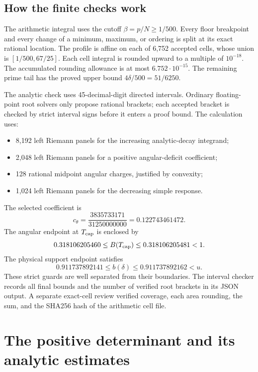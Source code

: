 \documentclass[11pt]{article}
\theoremstyle{definition}\newtheorem{definition}[theorem]{Definition}
\theoremstyle{remark}\newtheorem{remark}[theorem]{Remark}
\begin{document}
\subsection{How the finite checks work}
The arithmetic integral uses the cutoff $\beta=p/N\ge1/500$. Every floor breakpoint and every change of a minimum, maximum, or ordering is split at its exact rational location. The profile is affine on each of 6,752 accepted cells, whose union is $[1/500,67/25]$. Each cell integral is rounded upward to a multiple of $10^{-18}$. The accumulated rounding allowance is at most $6.752\cdot10^{-15}$. The remaining prime tail has the proved upper bound $4\delta/500=51/6250$.

The analytic check uses 45-decimal-digit directed intervals. Ordinary floating-point root solvers only propose rational brackets; each accepted bracket is checked by strict interval signs before it enters a proof bound. The calculation uses:
\begin{itemize}
\item 8,192 left Riemann panels for the increasing analytic-decay integrand;
\item 2,048 left Riemann panels for a positive angular-deficit coefficient;
\item 128 rational midpoint angular charges, justified by convexity;
\item 1,024 left Riemann panels for the decreasing simple response.
\end{itemize}
The selected coefficient is
\[
 c_\theta=\frac{3835733171}{31250000000}=0.122743461472.
\]
The angular endpoint at $T_{\rm cap}$ is enclosed by
\[
 0.318106205460\le B(T_{\rm cap})\le0.318106205481<1.
\]
The physical support endpoint satisfies
\[
 0.911737892141\le b(\delta)\le0.911737892162<u.
\]
These strict guards are well separated from their boundaries. The interval checker records all final bounds and the number of verified root brackets in its JSON output. A separate exact-cell review verified coverage, each area rounding, the sum, and the SHA256 hash of the arithmetic cell file.


\section{The positive determinant and its analytic estimates}
\label{z3a:section}
\end{document}
